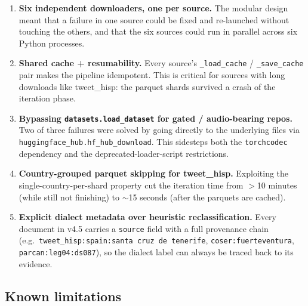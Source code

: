 \documentclass[11pt,a4paper]{article}
\begin{document}
\begin{enumerate}
  \item \textbf{Six independent downloaders, one per source.} The
        modular design meant that a failure in one source could be fixed
        and re-launched without touching the others, and that the six
        sources could run in parallel across six Python processes.
  \item \textbf{Shared cache + resumability.} Every source's
        \texttt{\_load\_cache} / \texttt{\_save\_cache} pair makes the
        pipeline idempotent. This is critical for sources with long
        downloads like tweet\_hisp: the parquet shards survived a crash
        of the iteration phase.
  \item \textbf{Bypassing \texttt{datasets.load\_dataset} for gated /
        audio-bearing repos.} Two of three failures were solved by
        going directly to the underlying files via
        \texttt{huggingface\_hub.hf\_hub\_download}. This sidesteps both
        the \texttt{torchcodec} dependency and the deprecated-loader-script
        restrictions.
  \item \textbf{Country-grouped parquet skipping for tweet\_hisp.}
        Exploiting the single-country-per-shard property cut the
        iteration time from $>$10 minutes (while still not finishing) to
        $\sim$15 seconds (after the parquets are cached).
  \item \textbf{Explicit dialect metadata over heuristic
        reclassification.} Every document in v4.5 carries a
        \texttt{source} field with a full provenance chain
        (e.g.\ \texttt{tweet\_hisp:spain:santa cruz de tenerife},
        \texttt{coser:fuerteventura}, \texttt{parcan:leg04:ds087}), so
        the dialect label can always be traced back to its evidence.
\end{enumerate}

\subsection{Known limitations}
\end{document}
